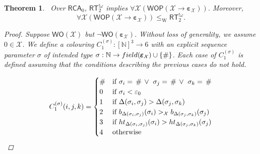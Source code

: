 \documentclass{amsart}
\newcommand\Nat{\mathbb{N}}
\newcommand\RCA{\mathsf{RCA}}
\newcommand\RT{\mathsf{RT}}
\newcommand\WO{\mathsf{WO}}
\newcommand\WOP{\mathsf{WOP}}
\newcommand\W{\mathrm{W}}
\newcommand{\LoX}{\mathcal{X}}
\newcommand\boldomega{\pmb{\omega}}
\newcommand\boldepsilon{\pmb{\varepsilon}}
\newcommand\additionalsymbol{\text{\small{\#}}}
\newtheorem{theorem}{Theorem}
\begin{document}
\begin{theorem}\label{thm:RTomega}
\ Over $\RCA_0$, $\RT^{!\omega}_2$ implies $\forall \LoX (\WOP(\LoX \rightarrow \boldepsilon_\LoX))$. Moreover, 
$$\forall \LoX (\WOP(\LoX \rightarrow \boldepsilon_\LoX)) \leq_\W \RT^{!\omega}_2.$$

\begin{proof}
Suppose $\WO(\LoX)$ but $\neg\WO(\boldepsilon_\LoX)$. Without loss of generality, we assume $0 \in \LoX$. We define a colouring $C_1^{(\sigma)} : [\Nat]^3 \rightarrow 6$ with an explicit sequence parameter $\sigma$ of intended type $\sigma : \Nat \rightarrow field(\boldepsilon_\LoX) \cup \{\additionalsymbol\}$.  Each case of $C_1^{(\sigma)}$ is defined assuming that the conditions describing the previous cases do not hold.

\begin{equation*}
    C_1^{(\sigma)}(i,j,k) = 
    \begin{cases}
    \additionalsymbol   &\text{if }\sigma_i=\,\additionalsymbol \,\lor\ \sigma_j=\,\additionalsymbol \,\lor\ \sigma_k=\,\additionalsymbol\\
    0   &\text{if }\sigma_i < \varepsilon_0\\
    1   &\text{if }\Delta(\sigma_i,\sigma_j) > \Delta(\sigma_j,\sigma_k)\\
    2   &\text{if } b_{\Delta(\sigma_i,\sigma_j)}(\sigma_i) >_\LoX b_{\Delta(\sigma_j,\sigma_k)}(\sigma_j)\\
    3   &\text{if } ht_{\Delta(\sigma_i,\sigma_j)}(\sigma_i) > ht_{\Delta(\sigma_j,\sigma_k)}(\sigma_j)\\
    4   &\text{otherwise}
    \end{cases}
\end{equation*}





\end{proof}
\end{theorem}
\end{document}
